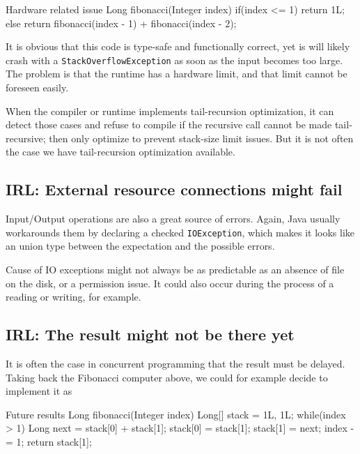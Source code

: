 \documentclass[12pt,a4paper]{report}
\renewcommand{\baselinestretch}{1.5}
\theoremstyle{theorem}
\theoremstyle{definition}
\begin{document}
\renewcommand{\baselinestretch}{1} 
\selectfont

\begin{javacode}{Hardware related issue}
Long fibonacci(Integer index)
{
  if(index <= 1) return 1L;
  else
    return fibonacci(index - 1) + fibonacci(index - 2);
}
\end{javacode}

\renewcommand{\baselinestretch}{1.5} 
\selectfont

It is obvious that this code is type-safe and functionally correct,
yet is will likely crash with a \lstinline{StackOverflowException}{}
as soon as the input becomes too large. The problem is that the runtime
has a hardware limit, and that limit cannot be foreseen easily.

When the compiler or runtime implements tail-recursion optimization,
it can detect those cases and refuse to compile if the recursive
call cannot be made tail-recursive; then only optimize
to prevent stack-size limit issues. But it is not often the case we
have tail-recursion optimization available.

\subsection{IRL: External resource connections might fail}

Input/Output operations are also a great source of errors.
Again, Java usually workarounds them by declaring a checked
\lstinline{IOException}{}, which makes it looks like an union type
between the expectation and the possible errors.

Cause of IO exceptions might not always be as predictable as
an absence of file on the disk, or a permission issue. It could also
occur during the process of a reading or writing, for example.

\subsection{IRL: The result might not be there yet}

It is often the case in concurrent programming that the result must be
delayed. Taking back the Fibonacci computer above,
we could for example decide to implement it as

\renewcommand{\baselinestretch}{1} 
\selectfont

\begin{javacode}{Future results}
Long fibonacci(Integer index)
{
  Long[] stack = {1L, 1L};
  while(index > 1) {
    Long next = stack[0] + stack[1];
    stack[0] = stack[1];
    stack[1] = next;
    index -= 1;
  }
  return stack[1];
}
\end{javacode}
\end{document}
